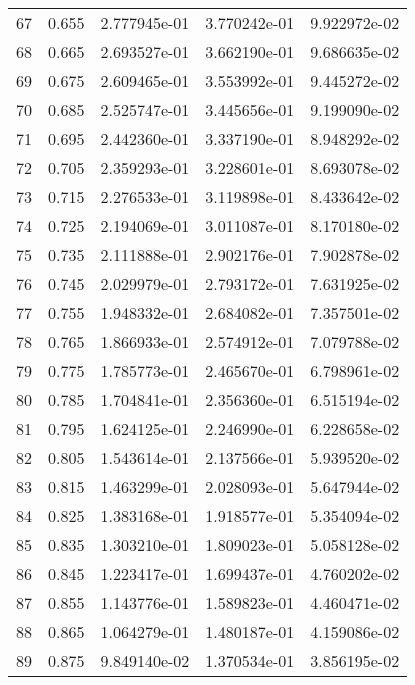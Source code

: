 \begin{table}[ht]
\begin{tabular}{rcccc}
    67 &  0.655 &    2.777945e-01 &    3.770242e-01  &     9.922972e-02\\ 
    68 &  0.665 &    2.693527e-01 &    3.662190e-01  &     9.686635e-02\\ 
    69 &  0.675 &    2.609465e-01 &    3.553992e-01  &     9.445272e-02\\ 
    70 &  0.685 &    2.525747e-01 &    3.445656e-01  &     9.199090e-02\\ 
    71 &  0.695 &    2.442360e-01 &    3.337190e-01  &     8.948292e-02\\ 
    72 &  0.705 &    2.359293e-01 &    3.228601e-01  &     8.693078e-02\\ 
    73 &  0.715 &    2.276533e-01 &    3.119898e-01  &     8.433642e-02\\ 
    74 &  0.725 &    2.194069e-01 &    3.011087e-01  &     8.170180e-02\\ 
    75 &  0.735 &    2.111888e-01 &    2.902176e-01  &     7.902878e-02\\ 
    76 &  0.745 &    2.029979e-01 &    2.793172e-01  &     7.631925e-02\\ 
    77 &  0.755 &    1.948332e-01 &    2.684082e-01  &     7.357501e-02\\ 
    78 &  0.765 &    1.866933e-01 &    2.574912e-01  &     7.079788e-02\\ 
    79 &  0.775 &    1.785773e-01 &    2.465670e-01  &     6.798961e-02\\ 
    80 &  0.785 &    1.704841e-01 &    2.356360e-01  &     6.515194e-02\\ 
    81 &  0.795 &    1.624125e-01 &    2.246990e-01  &     6.228658e-02\\ 
    82 &  0.805 &    1.543614e-01 &    2.137566e-01  &     5.939520e-02\\ 
    83 &  0.815 &    1.463299e-01 &    2.028093e-01  &     5.647944e-02\\ 
    84 &  0.825 &    1.383168e-01 &    1.918577e-01  &     5.354094e-02\\ 
    85 &  0.835 &    1.303210e-01 &    1.809023e-01  &     5.058128e-02\\ 
    86 &  0.845 &    1.223417e-01 &    1.699437e-01  &     4.760202e-02\\ 
    87 &  0.855 &    1.143776e-01 &    1.589823e-01  &     4.460471e-02\\ 
    88 &  0.865 &    1.064279e-01 &    1.480187e-01  &     4.159086e-02\\ 
    89 &  0.875 &    9.849140e-02 &    1.370534e-01  &     3.856195e-02\\ 

\end{tabular}
\end{table}
